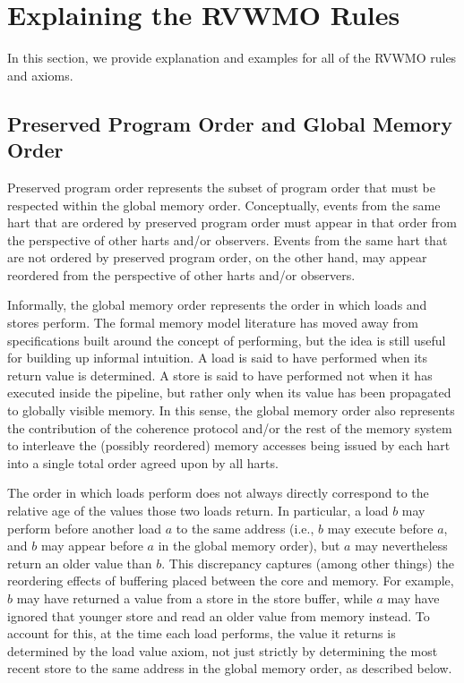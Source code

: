 \section{Explaining the RVWMO Rules}
In this section, we provide explanation and examples for all of the RVWMO rules and axioms.

\subsection{Preserved Program Order and Global Memory Order}
Preserved program order represents the subset of program order that must be respected within the global memory order.
Conceptually, events from the same hart that are ordered by preserved program order must appear in that order from the perspective of other harts and/or observers.
Events from the same hart that are not ordered by preserved program order, on the other hand, may appear reordered from the perspective of other harts and/or observers.

Informally, the global memory order represents the order in which loads and stores perform.
The formal memory model literature has moved away from specifications built around the concept of performing, but the idea is still useful for building up informal intuition.
A load is said to have performed when its return value is determined.
A store is said to have performed not when it has executed inside the pipeline, but rather only when its value has been propagated to globally visible memory.
In this sense, the global memory order also represents the contribution of the coherence protocol and/or the rest of the memory system to interleave the (possibly reordered) memory accesses being issued by each hart into a single total order agreed upon by all harts.

The order in which loads perform does not always directly correspond to the relative age of the values those two loads return.
In particular, a load $b$ may perform before another load $a$ to the same address (i.e., $b$ may execute before $a$, and $b$ may appear before $a$ in the global memory order), but $a$ may nevertheless return an older value than $b$.
This discrepancy captures (among other things) the reordering effects of buffering placed between the core and memory.
For example, $b$ may have returned a value from a store in the store buffer, while $a$ may have ignored that younger store and read an older value from memory instead.
To account for this, at the time each load performs, the value it returns is determined by the load value axiom, not just strictly by determining the most recent store to the same address in the global memory order, as described below.

